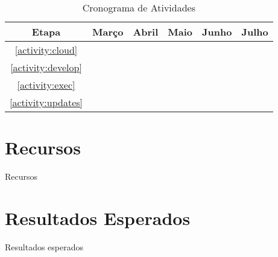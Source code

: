 \documentclass[12pt]{article}
\begin{document}
\begin{table}[ht]
\centering
\begin{tabular}{c|ccccc}
	Etapa & Março & Abril & Maio & Junho & Julho \\ \hline
	\ref{activity:cloud} & \checkmark & & & \\
	\ref{activity:develop} & \checkmark & \checkmark & & \\
	\ref{activity:exec} & & \checkmark & \checkmark & \checkmark & \\
	\ref{activity:updates} & & &\checkmark & \checkmark & \checkmark \\
\end{tabular}
\caption{Cronograma de Atividades}

\end{table}
\section{Recursos}
Recursos
\section{Resultados Esperados}
Resultados esperados


\end{document}

